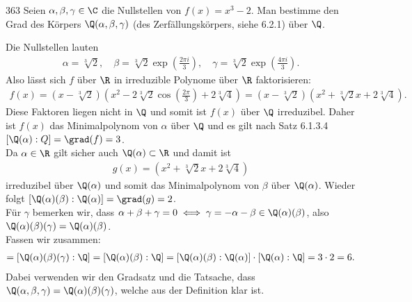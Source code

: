 \begin{algebraUE}{363}
  Seien $\alpha, \beta, \gamma \in \C$ die Nullstellen von $f(x) = x^3 - 2.$ Man bestimme den Grad des Körpers $\Q(\alpha, \beta, \gamma)$ (des Zerfällungskörpers, siehe 6.2.1) über $\Q$.
\end{algebraUE}

\begin{solution}
Die Nullstellen lauten
\begin{align*}
  \alpha = \sqrt[3]{2}, \quad \beta = \sqrt[3]{2}\exp\left(\frac{2\pi i}{3}\right), \quad \gamma = \sqrt[3]{2}\exp\left(\frac{4\pi i}{3}\right).
\end{align*}
Also lässt sich $f$ über $\R$ in irreduzible Polynome über $\R$ faktorisieren:
\begin{align*}
  f(x) = (x - \sqrt[3]{2})(x^2 - 2\sqrt[3]{2}\cos\left(\frac{2\pi}{3}\right) + 2\sqrt[3]{4}) = (x - \sqrt[3]{2})(x^2 + \sqrt[3]{2} x + 2\sqrt[3]{4}).
\end{align*}
Diese Faktoren liegen nicht in $\Q$ und somit ist $f(x)$ über $\Q$ irreduzibel.
Daher ist $f(x)$ das Minimalpolynom von $\alpha$ über $\Q$ und es gilt nach Satz 6.1.3.4
$[\Q(\alpha): Q] = \grad(f) = 3$. \\
Da $\alpha \in \R$ gilt sicher auch $\Q(\alpha) \subset \R$ und damit ist
\begin{align*}
  g(x) = (x^2 + \sqrt[3]{2} x + 2\sqrt[3]{4})
\end{align*}
irreduzibel über $\Q(\alpha)$ und somit das Minimalpolynom von $\beta$ über $\Q(\alpha)$.
Wieder folgt $[\Q(\alpha)(\beta): \Q(\alpha)] = \grad(g) = 2$. \\
Für $\gamma$ bemerken wir, dass $\alpha + \beta + \gamma = 0 \iff \gamma = -\alpha - \beta \in \Q(\alpha)(\beta)$,
also $\Q(\alpha)(\beta)(\gamma) = \Q(\alpha)(\beta)$. \\
Fassen wir zusammen:
\begin{align*}
  [\Q(\alpha,\beta,\gamma): \Q] =  [\Q(\alpha)(\beta)(\gamma): \Q]
  = [\Q(\alpha)(\beta): \Q] = [\Q(\alpha)(\beta): \Q(\alpha)]\cdot[\Q(\alpha): \Q] = 3\cdot2= 6.
\end{align*}
Dabei verwenden wir den Gradsatz und die Tatsache, dass $\Q(\alpha,\beta,\gamma) = \Q(\alpha)(\beta)(\gamma)$,
welche aus der Definition klar ist.
\end{solution}

